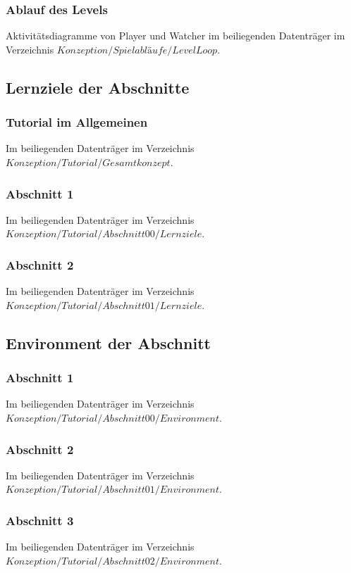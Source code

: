 \documentclass[
	12pt,
	a4paper,
	bibtotoc,
	cleardoubleempty, 
	idxtotoc,
	ngerman,
	openright
	final,
	listof=nochaptergap,
	]{scrbook}
\begin{document}
\begin{appendices}
\subsubsection{Ablauf des Levels}\label{sec:append_levelloop}
Aktivitätsdiagramme von Player und Watcher im beiliegenden Datenträger im Verzeichnis $Konzeption/Spielabläufe/LevelLoop$.

\newpage


\subsection{Lernziele der Abschnitte}

\subsubsection{Tutorial im Allgemeinen}
Im beiliegenden Datenträger im Verzeichnis  $Konzeption/Tutorial/Gesamtkonzept$.

\subsubsection{Abschnitt 1}
Im beiliegenden Datenträger im Verzeichnis  $Konzeption/Tutorial/Abschnitt00/Lernziele$.

\subsubsection{Abschnitt 2}
Im beiliegenden Datenträger im Verzeichnis  $Konzeption/Tutorial/Abschnitt01/Lernziele$.


\subsection{Environment der Abschnitt}

\subsubsection{Abschnitt 1}
Im beiliegenden Datenträger im Verzeichnis  $Konzeption/Tutorial/Abschnitt00/Environment$.

\subsubsection{Abschnitt 2}
Im beiliegenden Datenträger im Verzeichnis  $Konzeption/Tutorial/Abschnitt01/Environment$.

\subsubsection{Abschnitt 3}
Im beiliegenden Datenträger im Verzeichnis  $Konzeption/Tutorial/Abschnitt02/Environment$.


\end{appendices}
\end{document}
